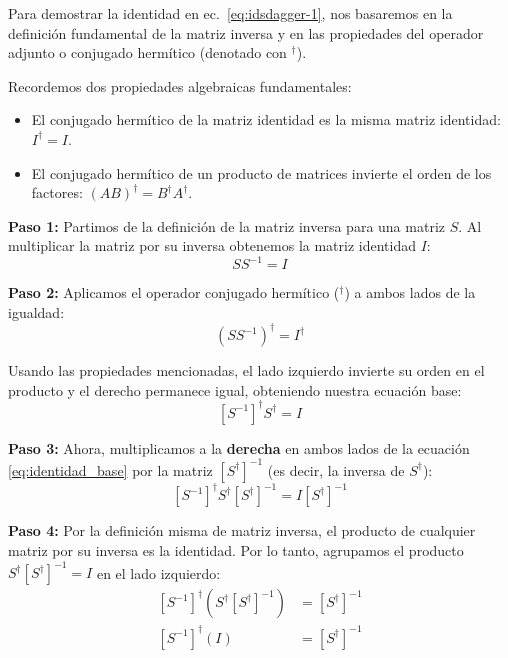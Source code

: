 Para demostrar la identidad en ec.~\eqref{eq:idsdagger-1}, nos basaremos en la definición fundamental de la matriz inversa y en las propiedades del operador adjunto o conjugado hermítico (denotado con $^\dagger$).

Recordemos dos propiedades algebraicas fundamentales:
\begin{itemize}
    \item El conjugado hermítico de la matriz identidad es la misma matriz identidad: $I^\dagger = I$.
    \item El conjugado hermítico de un producto de matrices invierte el orden de los factores: $(AB)^\dagger = B^\dagger A^\dagger$.
\end{itemize}

\textbf{Paso 1:} Partimos de la definición de la matriz inversa para una matriz $S$. Al multiplicar la matriz por su inversa obtenemos la matriz identidad $I$:
\begin{equation}
    S S^{-1} = I
\end{equation}

\textbf{Paso 2:} Aplicamos el operador conjugado hermítico ($^\dagger$) a ambos lados de la igualdad:
\begin{equation}
    (S S^{-1})^\dagger = I^\dagger
\end{equation}

Usando las propiedades mencionadas, el lado izquierdo invierte su orden en el producto y el derecho permanece igual, obteniendo nuestra ecuación base:
\begin{equation}
    \left[S^{-1}\right]^\dagger S^\dagger = I
    \label{eq:identidad_base}
\end{equation}

\textbf{Paso 3:} Ahora, multiplicamos a la \textbf{derecha} en ambos lados de la ecuación \eqref{eq:identidad_base} por la matriz $\left[S^\dagger\right]^{-1}$ (es decir, la inversa de $S^\dagger$):
\begin{equation}
    \left[S^{-1}\right]^\dagger S^\dagger \left[S^\dagger\right]^{-1} = I \left[S^\dagger\right]^{-1}
\end{equation}

\textbf{Paso 4:} Por la definición misma de matriz inversa, el producto de cualquier matriz por su inversa es la identidad. Por lo tanto, agrupamos el producto $S^\dagger \left[S^\dagger\right]^{-1} = I$ en el lado izquierdo:
\begin{align}
    \left[S^{-1}\right]^\dagger \left( S^\dagger \left[S^\dagger\right]^{-1} \right) &= \left[S^\dagger\right]^{-1} \nonumber \\
    \left[S^{-1}\right]^\dagger (I) &= \left[S^\dagger\right]^{-1}
\end{align}

